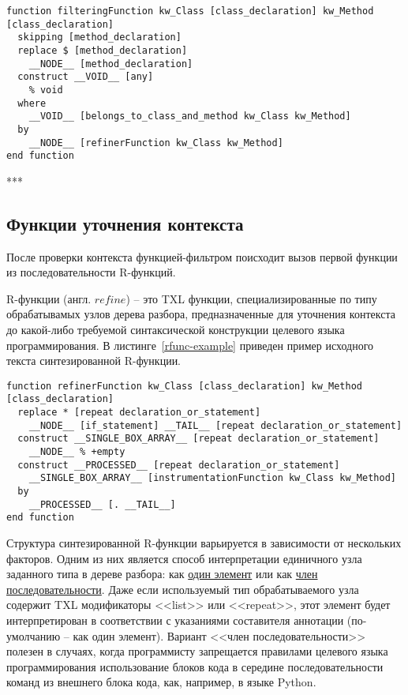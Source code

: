 \begin{lstlisting}[language=TXL, label={ffunc-example}, caption={Пример синтезированной F-функции.}]
function filteringFunction kw_Class [class_declaration] kw_Method [class_declaration]
  skipping [method_declaration]
  replace $ [method_declaration]
    __NODE__ [method_declaration]
  construct __VOID__ [any]
    % void
  where
    __VOID__ [belongs_to_class_and_method kw_Class kw_Method]
  by
    __NODE__ [refinerFunction kw_Class kw_Method]
end function
\end{lstlisting}

***

\subsection{Функции уточнения контекста}

После проверки контекста функцией-фильтром поисходит вызов первой функции из последовательности R-функций.

R-функции (англ. $refine$) -- это TXL функции, специализированные по типу обрабатывамых узлов дерева разбора, предназначенные для уточнения контекста до какой-либо требуемой синтаксической конструкции целевого языка программирования.
В листинге~\ref{rfunc-example} приведен пример исходного текста синтезированной R-функции.

\begin{lstlisting}[frame=single, language=TXL, label={rfunc-example}, caption={Пример синтезированной R-функции.}]
function refinerFunction kw_Class [class_declaration] kw_Method [class_declaration]
  replace * [repeat declaration_or_statement]
    __NODE__ [if_statement] __TAIL__ [repeat declaration_or_statement]
  construct __SINGLE_BOX_ARRAY__ [repeat declaration_or_statement]
    __NODE__ % +empty
  construct __PROCESSED__ [repeat declaration_or_statement]
    __SINGLE_BOX_ARRAY__ [instrumentationFunction kw_Class kw_Method]
  by
    __PROCESSED__ [. __TAIL__]
end function
\end{lstlisting}

Структура синтезированной R-функции варьируется в зависимости от нескольких факторов.
Одним из них является способ интерпретации единичного узла заданного типа в дереве разбора: как \underline{один элемент} или как \underline{член последовательности}.
Даже если используемый тип обрабатываемого узла содержит TXL модификаторы <<list>> или <<repeat>>, этот элемент будет интерпретирован в соответствии с указаниями составителя аннотации (по-умолчанию -- как один элемент).
Вариант <<член последовательности>> полезен в случаях, когда программисту запрещается правилами целевого языка программирования использование блоков кода в середине последовательности команд из внешнего блока кода, как, например, в языке Python.

